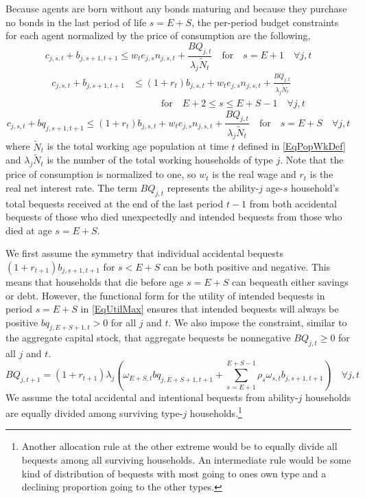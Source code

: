 \documentclass[letterpaper,12pt]{article}
\theoremstyle{definition}
\begin{document}
\begin{spacing}{1.5}
    Because agents are born without any bonds maturing and because they purchase no bonds in the last period of life $s=E+S$, the per-period budget constraints for each agent normalized by the price of consumption are the following,
    \begin{equation}\label{EqBC1}
      c_{j,s,t} + b_{j,s+1,t+1} \leq w_t e_{j,s}n_{j,s,t} + \frac{BQ_{j,t}}{\lambda_j\tilde{N}_t} \quad \text{for} \quad s = E+1 \quad \forall j,t
    \end{equation}
    \begin{equation}\label{EqBC2}
      \begin{split}
        c_{j,s,t} + b_{j,s+1,t+1} &\leq \left(1 + r_t\right) b_{j,s,t} + w_t e_{j,s}n_{j,s,t} + \frac{BQ_{j,t}}{\lambda_j\tilde{N}_t} \\
        &\quad\quad\quad \text{for} \quad E+2\leq s \leq E+S-1 \quad \forall j,t
      \end{split}
    \end{equation}
    \begin{equation}\label{EqBC3}
      c_{j,s,t} + bq_{j,s+1,t+1} \leq \left(1 + r_t\right) b_{j,s,t} + w_t e_{j,s}n_{j,s,t} + \frac{BQ_{j,t}}{\lambda_j\tilde{N}_t} \quad \text{for} \quad s = E+S \quad \forall j,t
    \end{equation}
    where $\tilde{N}_t$ is the total working age population at time $t$ defined in \eqref{EqPopWkDef} and $\lambda_j\tilde{N}_t$ is the number of the total working households of type $j$. Note that the price of consumption is normalized to one, so $w_t$ is the real wage and $r_t$ is the real net interest rate. The term $BQ_{j,t}$ represents the ability-$j$ age-$s$ household's total bequests received at the end of the last period $t-1$ from both accidental bequests of those who died unexpectedly and intended bequests from those who died at age $s=E+S$.

    We first assume the symmetry that individual accidental bequests $(1+r_{t+1})b_{j,s+1,t+1}$ for $s<E+S$ can be both positive and negative. This means that households that die before age $s=E+S$ can bequeath either savings or debt. However, the functional form for the utility of intended bequests in period $s=E+S$ in \eqref{EqUtilMax} ensures that intended bequests will always be positive $bq_{j,E+S+1,t}>0$ for all $j$ and $t$. We also impose the constraint, similar to the aggregate capital stock, that aggregate bequests be nonnegative $BQ_{j,t}\geq 0$ for all $j$ and $t$.
    \begin{equation}\label{EqTotBeq}
      BQ_{j,t+1} = (1+r_{t+1})\lambda_j\left(\omega_{E+S,t}bq_{j,E+S+1,t+1} + \sum_{s=E+1}^{E+S-1}\rho_s\omega_{s,t}b_{j,s+1,t+1}\right) \quad\forall j,t
    \end{equation}
    We assume the total accidental and intentional bequests from ability-$j$ households are equally divided among surviving type-$j$ households.\footnote{Another allocation rule at the other extreme would be to equally divide all bequests among all surviving households. An intermediate rule would be some kind of distribution of bequests with most going to ones own type and a declining proportion going to the other types.}


\end{spacing}
\end{document}
